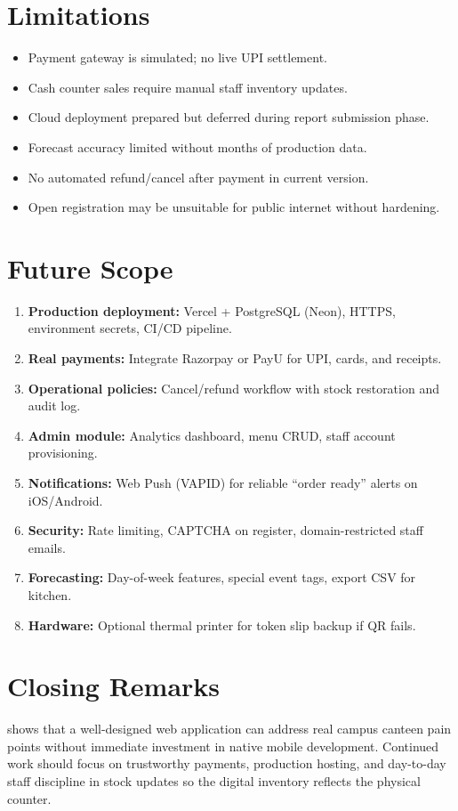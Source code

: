 \section{Limitations}
\begin{itemize}
  \item Payment gateway is simulated; no live UPI settlement.
  \item Cash counter sales require manual staff inventory updates.
  \item Cloud deployment prepared but deferred during report submission phase.
  \item Forecast accuracy limited without months of production data.
  \item No automated refund/cancel after payment in current version.
  \item Open registration may be unsuitable for public internet without hardening.
\end{itemize}

\section{Future Scope}
\begin{enumerate}
  \item \textbf{Production deployment:} Vercel + PostgreSQL (Neon), HTTPS, environment secrets, CI/CD pipeline.
  \item \textbf{Real payments:} Integrate Razorpay or PayU for UPI, cards, and receipts.
  \item \textbf{Operational policies:} Cancel/refund workflow with stock restoration and audit log.
  \item \textbf{Admin module:} Analytics dashboard, menu CRUD, staff account provisioning.
  \item \textbf{Notifications:} Web Push (VAPID) for reliable ``order ready'' alerts on iOS/Android.
  \item \textbf{Security:} Rate limiting, CAPTCHA on register, domain-restricted staff emails.
  \item \textbf{Forecasting:} Day-of-week features, special event tags, export CSV for kitchen.
  \item \textbf{Hardware:} Optional thermal printer for token slip backup if QR fails.
\end{enumerate}

\section{Closing Remarks}
\ShortTitle{} shows that a well-designed web application can address real campus canteen pain points without immediate investment in native mobile development. Continued work should focus on trustworthy payments, production hosting, and day-to-day staff discipline in stock updates so the digital inventory reflects the physical counter.
